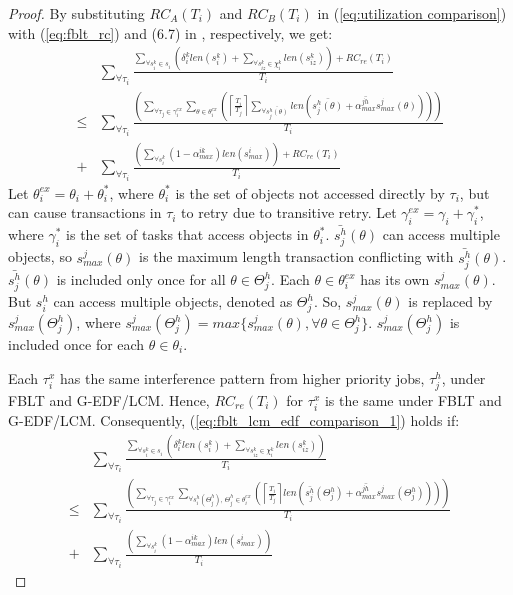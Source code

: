 \documentclass[a4paper,english]{article}
\newtheorem{proof}{Proof}
\begin{document}
\begin{proof}\normalfont

By substituting $RC_{A}(T_{i})$ and $RC_{B}(T_{i})$ in (\ref{eq:utilization comparison})
with (\ref{eq:fblt_rc}) and (6.7) in \cite{shambake_phd_proposal}, respectively, we get:
\begin{eqnarray}
 & \sum_{\forall\tau_{i}}\frac{\sum_{\forall s_{i}^{k}\in s_{i}}\left(\delta_i^klen(s_{i}^{k})+\sum_{\forall s_{iz}^{k}\in\chi_{i}^{k}}len(s_{iz}^{k})\right)+RC_{re}(T_{i})}{T_{i}}\label{eq:fblt_lcm_edf_comparison_1}\\
\le & \sum_{\forall\tau_{i}}\frac{\left(\sum_{\forall\tau_{j}\in\gamma_{i}^{ex}}\sum_{\theta\in\theta_{i}^{ex}}\left(\left\lceil \frac{T_{i}}{T_{j}}\right\rceil \sum_{\forall\bar{s_{j}^{h}(\theta)}}len\left(\bar{s_{j}^{h}(\theta)}+\bar{\alpha_{max}^{jh}}s_{max}^{j}(\theta)\right)\right)\right)}{T_{i}}\nonumber \\
+ & \sum_{\forall\tau_{i}}\frac{\left(\sum_{\forall s_{i}^{k}}\left(1-\alpha_{max}^{ik}\right)len\left(s_{max}^{i}\right)\right)+RC_{re}(T_{i})}{T_{i}}\nonumber 
\end{eqnarray}
%
Let $\theta_{i}^{ex}=\theta_{i}+\theta_{i}^{*}$, where $\theta_{i}^{*}$
is the set of objects not accessed directly by $\tau_{i}$, but can
cause transactions in $\tau_{i}$ to retry due to transitive retry.
Let $\gamma_{i}^{ex}=\gamma_{i}+\gamma_{i}^{*}$, where $\gamma_{i}^{*}$
is the set of tasks that access objects in $\theta_{i}^{*}$. $\bar{s_{j}^{h}}(\theta)$
can access multiple objects, so $s_{max}^{j}(\theta)$ is the maximum
length transaction conflicting with $\bar{s_{j}^{h}}(\theta)$. $\bar{s_{j}^{h}}(\theta)$ is included only once for all $\theta \in \Theta_j^h$. Each $\theta \in \theta_i^{ex}$ has its own $s_{max}^j(\theta)$. But $s_i^h$ can access multiple objects, denoted as $\Theta_j^h$. So, $s_{max}^j(\theta)$ is replaced by $s_{max}^j(\Theta_j^h)$, where $s_{max}^j(\Theta_j^h)=max\{s_{max}^j(\theta),\forall \theta \in \Theta_j^h\}$. 
 $s_{max}^j(\Theta_j^h)$ is included once for each $\theta \in \theta_i$. 
 
 
 Each $\tau_i^x$ has the same interference pattern from higher priority jobs, $\tau_j^h$, under FBLT and G-EDF/LCM. Hence, $RC_{re}(T_i)$ for $\tau_i^x$ is the same under FBLT and G-EDF/LCM. Consequently, (\ref{eq:fblt_lcm_edf_comparison_1}) holds if:
\begin{eqnarray}
 & \sum_{\forall\tau_{i}}\frac{\sum_{\forall s_{i}^{k}\in s_{i}}\left(\delta_i^klen(s_{i}^{k})+\sum_{\forall s_{iz}^{k}\in\chi_{i}^{k}}len(s_{iz}^{k})\right)}{T_{i}}\label{eq:fblt_lcm_edf_comparison_2}\\
\le & \sum_{\forall\tau_{i}}\frac{\left(\sum_{\forall\tau_{j}\in\gamma_{i}^{ex}}\sum_{\forall s_i^h(\Theta_j^h),\,\Theta_j^h\in
\theta_{i}^{ex}}\left(\left\lceil \frac{T_{i}}{T_{j}}\right\rceil len\left(\bar{s_{j}^{h}}(\Theta_j^h)+\bar{\alpha_{max}^{jh}}s_{max}^{j}(\Theta_j^h)\right)\right)\right)}{T_{i}}\nonumber \\
+ & \sum_{\forall\tau_{i}}\frac{\left(\sum_{\forall s_{i}^{k}}\left(1-\alpha_{max}^{ik}\right)len\left(s_{max}^{i}\right)\right)}{T_{i}}\nonumber 
\end{eqnarray}


\end{proof}
\end{document}
